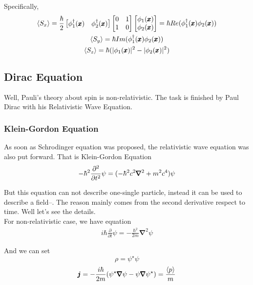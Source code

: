 Specifically, 
\begin{gather}
	\braket{S_x}=\frac{\hbar}{2} \begin{bmatrix}
		\phi^\dagger_1(\pmb{x})& \phi^\dagger_2(\pmb{x})
	\end{bmatrix} \begin{bmatrix}
		0&1\\
		1&0
	\end{bmatrix} \begin{bmatrix}
		\phi_1(\pmb{x})\\ \phi_2(\pmb{x})\end{bmatrix}=\hbar Re(\phi_1^\dagger(\pmb{x})\phi_2(\pmb{x}))\\
		\braket{S_y}=\hbar Im(\phi^\dagger_1(\pmb{x}) \phi_2(\pmb{x}))\\
		\braket{S_z}=\hbar (|\phi_1(\pmb{x})|^2-|\phi_2(\pmb{x})|^2)
\end{gather}

\subsection{Dirac Equation}
\label{sec: dirac equation}

Well, Pauli's theory about spin is non-relativistic. The task is finished by Paul Dirac with his Relativistic Wave Equation. 

\subsubsection{Klein-Gordon Equation}
\label{sec: klein gordon equation}

As soon as  Schrodinger equation was proposed, the relativistic wave equation was also put forward. That is Klein-Gordon Equation
\begin{align*}
	-\hbar^2 \frac{\partial^2}{\partial t^2}\psi=(-\hbar^2c^2 \pmb{\nabla}^2+m^2c^4)\psi
\end{align*}

But this equation can not describe one-single particle, instead it can be used to describe a field--. The reason mainly comes from the second derivative respect to time.  Well let's see the details.\\

For non-relativistic case, we have equation
\begin{align*}
	i\hbar \frac{\partial}{\partial t}\psi=-\frac{\hbar^2}{2m}\pmb{\nabla}^2\psi
\end{align*}

And we can set
$$\rho=\psi^\star \psi$$
$$\pmb{j}=-\frac{i\hbar}{2m}(\psi^\star\pmb{\nabla}\psi-\psi \pmb{\nabla}\psi^\star )=\frac{\braket{p}}{m}$$

